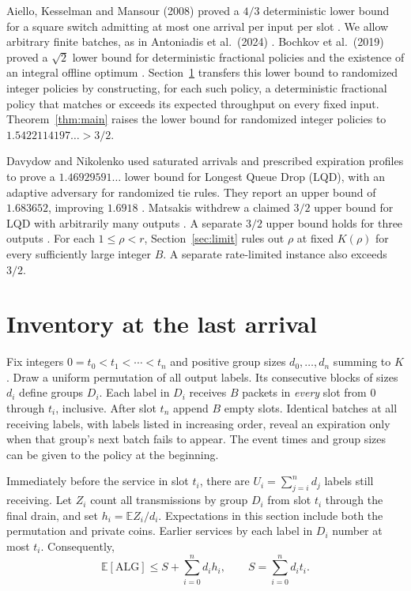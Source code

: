 \documentclass[11pt,letterpaper]{article}
\newcommand{\E}{\mathbb{E}}
\newcommand{\ALG}{\mathrm{ALG}}
\begin{document}
Aiello, Kesselman and Mansour (2008) proved a $4/3$ deterministic lower bound for a square switch admitting at most one arrival per input per slot \cite{aiello}. We allow arbitrary finite batches, as in Antoniadis et al.\ (2024) \cite{antoniadis}. Bochkov et al.\ (2019) proved a $\sqrt{2}$ lower bound for deterministic fractional policies and the existence of an integral offline optimum \cite[Thms.~2 and~4]{bochkov}. Section~\ref{sec:stock} transfers this lower bound to randomized integer policies by constructing, for each such policy, a deterministic fractional policy that matches or exceeds its expected throughput on every fixed input. Theorem~\ref{thm:main} raises the lower bound for randomized integer policies to $1.5422114197\ldots>3/2$.

Davydow and Nikolenko \cite{davydow} used saturated arrivals and prescribed expiration profiles to prove a $1.46929591\ldots$ lower bound for Longest Queue Drop (LQD), with an adaptive adversary for randomized tie rules. They report an upper bound of $1.683652$, improving $1.6918$ \cite{antoniadis}. Matsakis withdrew a claimed $3/2$ upper bound for LQD with arbitrarily many outputs \cite{matsakis}. A separate $3/2$ upper bound holds for three outputs \cite{three}. For each $1\le\rho<r$, Section~\ref{sec:limit} rules out $\rho$ at fixed $K(\rho)$ for every sufficiently large integer $B$. A separate rate-limited instance also exceeds $3/2$.

\newpage
\section{Inventory at the last arrival}\label{sec:stock}
Fix integers $0=t_0<t_1<\cdots<t_n$ and positive group sizes $d_0,\ldots,d_n$ summing to $K$. Draw a uniform permutation of all output labels. Its consecutive blocks of sizes $d_i$ define groups $D_i$. Each label in $D_i$ receives $B$ packets in \emph{every} slot from $0$ through $t_i$, inclusive. After slot $t_n$ append $B$ empty slots. Identical batches at all receiving labels, with labels listed in increasing order, reveal an expiration only when that group's next batch fails to appear. The event times and group sizes can be given to the policy at the beginning.

Immediately before the service in slot $t_i$, there are $U_i=\sum_{j=i}^n d_j$ labels still receiving. Let $Z_i$ count all transmissions by group $D_i$ from slot $t_i$ through the final drain, and set $h_i=\E Z_i/d_i$. Expectations in this section include both the permutation and private coins. Earlier services by each label in $D_i$ number at most $t_i$. Consequently,
\begin{equation}
 \E[\ALG]\le S+\sum_{i=0}^n d_i h_i,
 \qquad S=\sum_{i=0}^n d_i t_i.\label{eq:split}
\end{equation}
\end{document}
